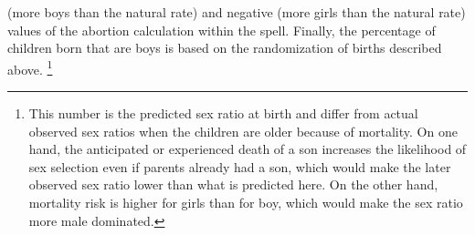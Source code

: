 \documentclass[12pt,letterpaper]{article}
\begin{document}
(more boys than the natural rate) and negative (more girls than the natural
rate) values of the abortion calculation within the spell.
Finally, the percentage of children born that are boys is based on the randomization of
births described above.%
\footnote{
This number is the predicted sex ratio at birth and differ from actual observed sex 
ratios when the children are older because of mortality.
On one hand, the anticipated or experienced death of a son increases the likelihood
of sex selection even if parents already had a son, which would make the later observed 
sex ratio lower than what is predicted here. 
On the other hand, mortality risk is higher for girls than for boy, which would make
the sex ratio more male dominated.
}
\end{document}
